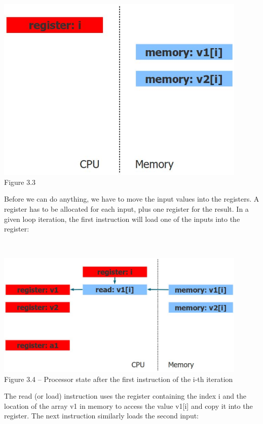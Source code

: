 \hspace*{\fill} \\ %
\begin{center}
\includegraphics[width=0.9\textwidth]{content/1/chapter3/images/3.jpg}\\
Figure 3.3
\end{center}

Before we can do anything, we have to move the input values into the registers. A register has to be allocated for each input, plus one register for the result. In a given loop iteration, the first instruction will load one of the inputs into the register:

\hspace*{\fill} \\ %
\begin{center}
\includegraphics[width=0.9\textwidth]{content/1/chapter3/images/4.jpg}\\
Figure 3.4 – Processor state after the first instruction of the i-th iteration
\end{center}

The read (or load) instruction uses the register containing the index i and the location of the array v1 in memory to access the value v1[i] and copy it into the register. The next instruction similarly loads the second input:

